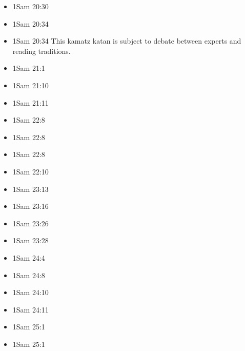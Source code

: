\documentclass[14pt]{book}
\begin{document}
\begin{multicols}{2}
\begin{itemize}
							\item 1Sam 20:30
							
							\item 1Sam 20:34
							
							\item 1Sam 20:34 This kamatz katan is subject to debate between experts and reading traditions.
							
							\item 1Sam 21:1
							
							\item 1Sam 21:10
							
							\item 1Sam 21:11
							
							\item 1Sam 22:8
							
							\item 1Sam 22:8
							
							\item 1Sam 22:8
							
							\item 1Sam 22:10
							
							\item 1Sam 23:13
							
							\item 1Sam 23:16
							
							\item 1Sam 23:26
							
							\item 1Sam 23:28
							
							\item 1Sam 24:4
							
							\item 1Sam 24:8
							
							\item 1Sam 24:10
							
							\item 1Sam 24:11
							
							\item 1Sam 25:1
							
							\item 1Sam 25:1
							

\end{itemize}
\end{multicols}
\end{document}
